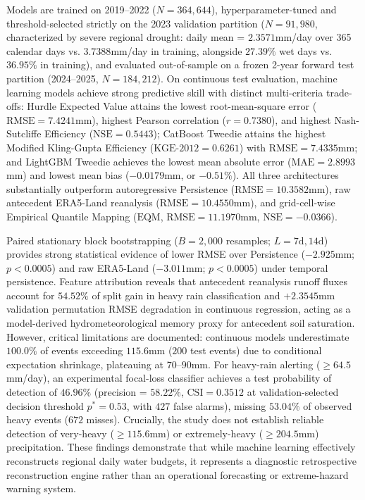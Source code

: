\documentclass[12pt]{article}
\begin{document}
Models are trained on 2019--2022 ($N = 364,644$), hyperparameter-tuned and threshold-selected strictly on the 2023 validation partition ($N = 91,980$, characterized by severe regional drought: daily mean = $2.3571$\;mm/day over 365 calendar days vs. $3.7388$\;mm/day in training, alongside $27.39\%$ wet days vs. $36.95\%$ in training), and evaluated out-of-sample on a frozen 2-year forward test partition (2024--2025, $N = 184,212$). On continuous test evaluation, machine learning models achieve strong predictive skill with distinct multi-criteria trade-offs: Hurdle Expected Value attains the lowest root-mean-square error ($\text{RMSE} = 7.4241$\;mm), highest Pearson correlation ($r = 0.7380$), and highest Nash-Sutcliffe Efficiency ($\text{NSE} = 0.5443$); CatBoost Tweedie attains the highest Modified Kling-Gupta Efficiency ($\text{KGE-2012} = 0.6261$) with $\text{RMSE} = 7.4335$\;mm; and LightGBM Tweedie achieves the lowest mean absolute error ($\text{MAE} = 2.8993$\;mm) and lowest mean bias ($-0.0179$\;mm, or $-0.51\%$). All three architectures substantially outperform autoregressive Persistence ($\text{RMSE} = 10.3582$\;mm), raw antecedent ERA5-Land reanalysis ($\text{RMSE} = 10.4550$\;mm), and grid-cell-wise Empirical Quantile Mapping ($\text{EQM}$, $\text{RMSE} = 11.1970$\;mm, $\text{NSE} = -0.0366$). 

Paired stationary block bootstrapping ($B = 2,000$ resamples; $L = 7\text{d}, 14\text{d}$) provides strong statistical evidence of lower RMSE over Persistence ($-2.925$\;mm; $p < 0.0005$) and raw ERA5-Land ($-3.011$\;mm; $p < 0.0005$) under temporal persistence. Feature attribution reveals that antecedent reanalysis runoff fluxes account for $54.52\%$ of split gain in heavy rain classification and $+2.3545$\;mm validation permutation RMSE degradation in continuous regression, acting as a model-derived hydrometeorological memory proxy for antecedent soil saturation. However, critical limitations are documented: continuous models underestimate $100.0\%$ of events exceeding $115.6$\;mm ($200$ test events) due to conditional expectation shrinkage, plateauing at $70$--$90$\;mm. For heavy-rain alerting ($\ge 64.5$\;mm/day), an experimental focal-loss classifier achieves a test probability of detection of $46.96\%$ (precision = $58.22\%$, $\text{CSI} = 0.3512$ at validation-selected decision threshold $p^* = 0.53$, with $427$ false alarms), missing $53.04\%$ of observed heavy events ($672$ misses). Crucially, the study does not establish reliable detection of very-heavy ($\ge 115.6$\;mm) or extremely-heavy ($\ge 204.5$\;mm) precipitation. These findings demonstrate that while machine learning effectively reconstructs regional daily water budgets, it represents a diagnostic retrospective reconstruction engine rather than an operational forecasting or extreme-hazard warning system.
\end{document}

